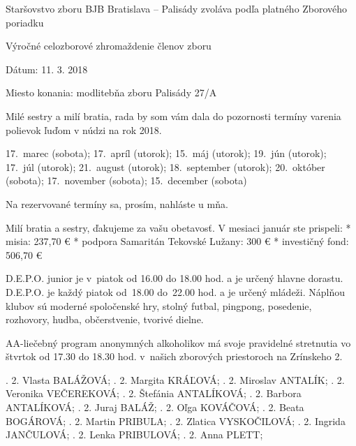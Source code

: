 

Staršovstvo zboru BJB Bratislava – Palisády zvoláva podľa platného Zborového poriadku

Výročné celozborové zhromaždenie členov zboru

Dátum: 11. 3. 2018

Miesto konania: modlitebňa zboru Palisády 27/A


Milé sestry a milí bratia, rada by som vám dala do pozornosti termíny varenia polievok ľuďom v núdzi na rok 2018.

17.~marec (sobota); 17.~apríl (utorok); 15.~máj (utorok); 19.~jún (utorok); 17.~júl (utorok); 21.~august (utorok); 18.~september (utorok); 20.~október (sobota); 17.~november (sobota); 15.~december (sobota)

Na rezervované termíny sa, prosím, nahláste u mňa.


Milí bratia a sestry, ďakujeme za vašu obetavosť. V mesiaci január ste prispeli:
\begitems
* misia: 237,70 €
* podpora Samaritán Tekovské Lužany: 300 €
* investičný fond: 506,70 €
\enditems

D.E.P.O. junior je v~piatok od 16.00 do 18.00 hod. a je určený hlavne dorastu. D.E.P.O. je každý piatok od~18.00 do~22.00 hod. a je určený mládeži. Náplňou klubov sú moderné spoločenské hry, stolný futbal, pingpong, posedenie, rozhovory, hudba, občerstvenie, tvorivé dielne.

AA-liečebný program anonymných alkoholikov má svoje pravidelné stretnutia vo štvrtok od 17.30 do 18.30 hod. v~našich zborových priestoroch na Zrínskeho 2.



.	2.	Vlasta	BALÁŽOVÁ;
.	2.	Margita 	KRÁĽOVÁ;
.	2.	Miroslav 	ANTALÍK;
.	2.	Veronika	VEČEREKOVÁ;
.	2.	Štefánia 	ANTALÍKOVÁ;
.	2.	Barbora 	ANTALÍKOVÁ;
.	2.	Juraj 	BALÁŽ;
.	2.	Oľga 	KOVÁČOVÁ;
.	2.	Beata 	BOGÁROVÁ;
. 2.	Martin	PRIBULA;
. 2.	Zlatica 	VYSKOČILOVÁ;
.	2.	Ingrida 	JANČULOVÁ;
. 2.	Lenka	PRIBULOVÁ;
.	2.	Anna	PLETT;
\narodeniny


